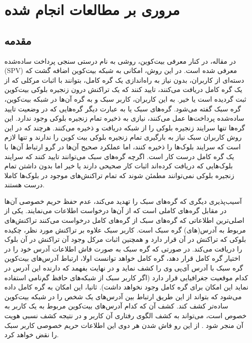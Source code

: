 \chapter{مروری بر مطالعات انجام شده}
\section{مقدمه}
در مقاله\cite{Nakamoto2009}، در کنار معرفی بیت‌کوین، روشی به نام درستی سنجی پرداخت ساده‌شده (SPV) معرفی شده است. در این روش، امکانی به شبکه بیت‌کوین اضافه گشت که دسته‌ای از کاربران، بدون نیاز به راه‌اندازی یک گره کامل، بتوانند با اثبات مرکلی که از یک گره کامل دریافت می‌کنند، تایید کنند که یک تراکنش درون زنجیره بلوکی بیت‌کوین ثبت گردیده‌ است یا خیر. به این کاربران، کاربر سبک و به گره آن‌ها در شبکه بیت‌کوین، گره سبک گفته می‌شود. گره‌های سبک یا به عبارت دیگر گره‌هایی که در وضعیت تایید ساده‌شده پرداخت‌ها عمل می‌کنند، نیازی به ذخیره تمام زنجیره بلوکی وجود ندارد. این گره‌ها تنها سرایند زنجیره بلوکی را از شبکه دریافت و ذخیره می‌کنند.  هرچند که در این روش کاربران سبک نیاز به بارگیری تمام زنجیره بلوکی بیت‌ کوین را ندارند و تنها لازم است که سرایند بلوک‌ها را ذخیره کنند،‌ اما عملکرد صحیح آن‌ها در گرو ارتباط آن‌ها با یک گره کامل درست کار است. اگرچه گره‌های سبک می‌توانند تایید کنند که سرایند بلوک‌هایی که دریافت کرده‌اند اثبات کار صحیحی دارند یا خیر اما بدون داشتن تمام زنجیره بلوکی نمی‌توانند مطمئن شوند که تمام تراکنش‌های موجود در بلوک‌ها کاملا درست هستند.

آسیب‌پذیری دیگری که گره‌های سبک را تهدید می‌کند، عدم حفظ حریم خصوصی آن‌ها در مقابل گره‌های کاملی است که از آن‌ها درخواست اطلاعات می‌نمایند. یکی از اصلی‌ترین اطلاعاتی که گره‌های سبک از گره‌های کامل درخواست می‌کنند تراکنش‌های مربوط به آدرس(های) گره سبک است. کاربر سبک علاوه بر تراکنش مورد نظر، چکیده بلوکی که تراکنش در آن قرار دارد و همچنین اثبات مرکل وجود آن تراکنش در آن بلوک را دریافت می‌کند. در صورتی که گره سبک به صورت فاش اطلاعات آدرس خود را در اختیار گره کامل قرار دهد، گره کامل خواهد توانست اولا، ارتباط آدرس‌های بیت‌کوین گره سبک با آدرس آی‌پی وی را کشف نماید و در نهایت بفهمد که دارنده این آدرس در کدام موقعیت جغرافیایی قرار دارد (اگر کاربر سبک از شبکه‌های حافظ گم‌نامی استفاده نماید این امکان برای گره کامل وجود نخواهد داشت). ثانیا، این امکان به گره کامل داده می‌شود که بتواند از این طریق ارتباط بین آدرس‌های یک شخص را در شبکه بیت‌کوین ساده‌تر کشف کند. کشف آن که کدام آدرس‌های بیت‌کوین مربوط به یک کاربر به خصوص است، می‌تواند به کشف الگوی رفتاری آن کاربر و در نتیجه کشف نسبی هویت آن منجر شود \cite{Ron2013}. از این رو فاش شدن هر دوی این اطلاعات حریم خصوصی کاربر سبک را نقض خواهد کرد.

